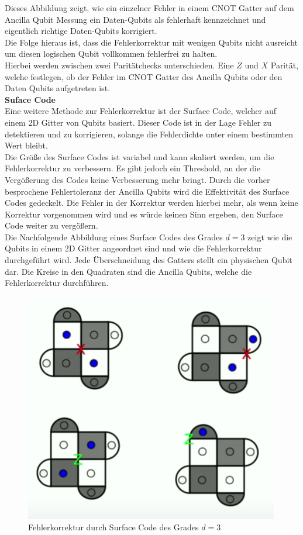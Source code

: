 Dieses Abbildung zeigt, wie ein einzelner Fehler in einem CNOT Gatter auf dem Ancilla Qubit Messung ein Daten-Qubits als fehlerhaft kennzeichnet und eigentlich richtige Daten-Qubits korrigiert.\\
Die Folge hieraus ist, dass die Fehlerkorrektur mit wenigen Qubits nicht ausreicht um diesen logischen Qubit vollkommen fehlerfrei zu halten.\\

Hierbei werden zwischen zwei Paritätchecks unterschieden. Eine $Z$ und $X$ Parität, welche festlegen, ob der Fehler im CNOT Gatter des Ancilla Qubits oder den Daten Qubits aufgetreten ist.\\

\textbf{Suface Code}\\
Eine weitere Methode zur Fehlerkorrektur ist der Surface Code, welcher auf einem 2D Gitter von Qubits basiert.
Dieser Code ist in der Lage Fehler zu detektieren und zu korrigieren, solange die Fehlerdichte unter einem bestimmten Wert bleibt.\\

Die Größe des Surface Codes ist variabel und kann skaliert werden, um die Fehlerkorrektur zu verbessern.
Es gibt jedoch ein Threshold, an der die Vergößerung des Codes keine Verbesserung mehr bringt.
Durch die vorher besprochene Fehlertoleranz der Ancilla Qubits wird die Effektivität des Surface Codes gedeckelt.
Die Fehler in der Korrektur werden hierbei mehr, als wenn keine Korrektur vorgenommen wird und es würde keinen Sinn ergeben, den Surface Code weiter zu vergößern.\\

Die Nachfolgende Abbildung eines Surface Codes des Grades $d=3$ zeigt wie die Qubits in einem 2D Gitter angeordnet sind und wie die Fehlerkorrektur durchgeführt wird.
Jede Überschneidung des Gatters stellt ein physischen Qubit dar. Die Kreise in den Quadraten sind die Ancilla Qubits, welche die Fehlerkorrektur durchführen.\\

\begin{figure}[H]
    \centering
    \includegraphics[width=0.6\linewidth]{img/Errors.png}
    \caption{Fehlerkorrektur durch Surface Code des Grades $d=3$}
    \label{fig:Surface-Code}
\end{figure}


